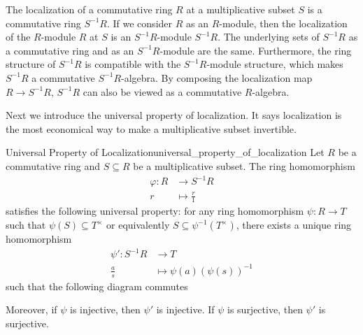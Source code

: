 The localization of a commutative ring $R$ at a multiplicative subset $S$ is a commutative ring $S^{-1}R$. If we consider $R$ as an $R$-module, then the localization of the $R$-module $R$ at $S$ is an $S^{-1}R$-module $S^{-1}R$. The underlying sets of $S^{-1}R$ as a commutative ring and as an $S^{-1}R$-module are the same. Furthermore, the ring structure of $S^{-1}R$ is compatible with the $S^{-1}R$-module structure, which makes $S^{-1}R$ a commutative $S^{-1}R$-algebra. By composing the localization map $R\to S^{-1}R$, $S^{-1}R$ can also be viewed as a commutative $R$-algebra.

Next we introduce the universal property of localization. It says localization is the most economical way to make a multiplicative subset invertible.


\begin{proposition}{Universal Property of Localization}{universal_property_of_localization}
    Let $R$ be a commutative ring and $S\subseteq R$ be a multiplicative subset. The ring homomorphism
    \begin{align*}
        \varphi:R&\longrightarrow S^{-1}R\\
         r&\longmapsto \frac{r}{1}
    \end{align*}
    satisfies the following universal property: for any ring homomorphism $\psi:R\to T$ such that $\psi(S)\subseteq T^\times$ or equivalently $S\subseteq \psi^{-1}(T^\times)$, there exists a unique ring homomorphism 
    \begin{align*}
        \psi':S^{-1}R&\longrightarrow T\\
        \frac{a}{s}&\longmapsto \psi(a)(\psi(s))^{-1}
    \end{align*}
    such that the following diagram commutes
    \begin{center}
    \end{center}
    Moreover, if $\psi$ is injective, then $\psi'$ is injective. If $\psi$ is surjective, then $\psi'$ is surjective.
\end{proposition}

